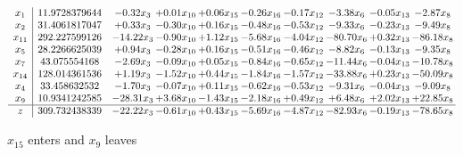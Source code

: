 \documentclass[9pt]{article}
\begin{document}
 \[\begin{array}{c| c c@{\hskip 2pt} c@{\hskip 2pt} c@{\hskip 2pt} c@{\hskip 2pt} c@{\hskip 2pt} c@{\hskip 2pt} c@{\hskip 2pt} c@{\hskip 2pt} }
 x_{1}   &  11.9728379644 & -0.32 x_{3} & +  0.01 x_{10} & +  0.06 x_{15} & -0.26 x_{16} & -0.17 x_{12} & -3.38 x_{6} & -0.05 x_{13} & -2.87 x_{8}\\
 x_{2}   &  31.4061817047 & +  0.33 x_{3} & -0.30 x_{10} & +  0.16 x_{15} & -0.48 x_{16} & -0.53 x_{12} & -9.33 x_{6} & -0.23 x_{13} & -9.49 x_{8}\\
 x_{11}   &  292.227599126 & -14.22 x_{3} & -0.90 x_{10} & +  1.12 x_{15} & -5.68 x_{16} & -4.04 x_{12} & -80.70 x_{6} & +  0.32 x_{13} & -86.18 x_{8}\\
 x_{5}   &  28.2266625039 & +  0.94 x_{3} & -0.28 x_{10} & +  0.16 x_{15} & -0.51 x_{16} & -0.46 x_{12} & -8.82 x_{6} & -0.13 x_{13} & -9.35 x_{8}\\
 x_{7}   &  43.075554168 & -2.69 x_{3} & -0.09 x_{10} & +  0.05 x_{15} & -0.84 x_{16} & -0.65 x_{12} & -11.44 x_{6} & -0.04 x_{13} & -10.78 x_{8}\\
 x_{14}   &  128.014361536 & +  1.19 x_{3} & -1.52 x_{10} & +  0.44 x_{15} & -1.84 x_{16} & -1.57 x_{12} & -33.88 x_{6} & +  0.23 x_{13} & -50.09 x_{8}\\
 x_{4}   &  33.458632532 & -1.70 x_{3} & -0.07 x_{10} & +  0.11 x_{15} & -0.62 x_{16} & -0.53 x_{12} & -9.31 x_{6} & -0.04 x_{13} & -9.09 x_{8}\\
 x_{9}   &  10.9341242585 & -28.31 x_{3} & +  3.68 x_{10} & -1.43 x_{15} & -2.18 x_{16} & +  0.49 x_{12} & +  6.48 x_{6} & +  2.02 x_{13} & + 22.85 x_{8}\\
\hline
z    &  309.732438339 & -22.22 x_{3} & -0.61 x_{10} & +  0.43 x_{15} & -5.69 x_{16} & -4.87 x_{12} & -82.93 x_{6} & -0.19 x_{13} & -78.65 x_{8}\\
\end{array}\]


 $ x_{15} $ enters and $ x_{9} $ leaves 
\end{document}
